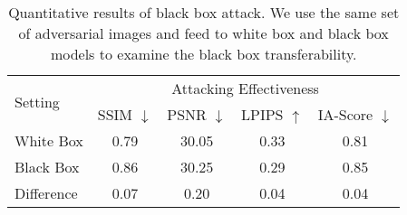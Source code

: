 
\begin{table}[t]
\footnotesize{
    \centering
    \begin{tabular}{lcccc}
        \toprule
        \multirow{2}{*}{Setting} & \multicolumn{4}{c}{Attacking Effectiveness} \\ 
         &  SSIM $\downarrow$ & PSNR $\downarrow$ & LPIPS $\uparrow$ & IA-Score $\downarrow$ \\
        \midrule
        White Box & 0.79 & 30.05 & 0.33 & 0.81 \\
        
        Black Box & 0.86 & 30.25 & 0.29 & 0.85 \\
    
        \midrule
        Difference & 0.07 & 0.20 & 0.04 & 0.04 \\
        \bottomrule
    \end{tabular}
    \caption{Quantitative results of black box attack. We use the same set of adversarial images and feed to white box and black box models to examine the black box transferability.} 
\label{tab:blackBox}
}
\end{table}